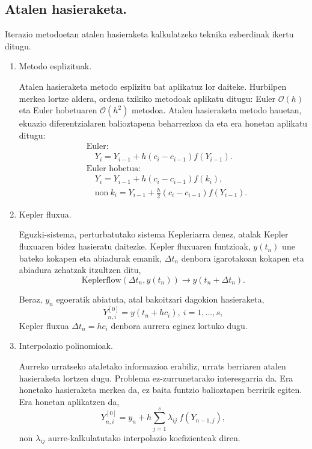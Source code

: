 \subsection*{Atalen hasieraketa.}

Iterazio metodoetan  atalen hasieraketa kalkulatzeko teknika ezberdinak ikertu ditugu. 
\begin{enumerate}
\item Metodo esplizituak.

Atalen hasieraketa metodo esplizitu bat aplikatuz lor daiteke. Hurbilpen merkea lortze aldera, ordena txikiko metodoak aplikatu ditugu: 
Euler  $\mathcal{O}(h)$ eta Euler hobetuaren $\mathcal{O}(h^2)$ metodoa. Atalen hasieraketa metodo hauetan, ekuazio diferentzialaren balioztapena beharrezkoa da eta era honetan aplikatu ditugu:
\begin{align*}
&\text{Euler}:\\
& \quad Y_i=Y_{i-1}+h (c_i-c_{i-1}) f(Y_{i-1}).\\
&\text{Euler hobetua}: \\
& \quad Y_i=Y_{i-1}+h (c_i-c_{i-1}) f(k_i),\\
& \quad \text{non} \ k_i=Y_{i-1}+\frac{h}{2} (c_i-c_{i-1}) f(Y_{i-1}).
\end{align*} 


\item Kepler fluxua.

Eguzki-sistema, perturbatutako sistema Kepleriarra denez, atalak Kepler fluxuaren bidez hasieratu daitezke. Kepler fluxuaren funtzioak, $y(t_n)$ une bateko kokapen eta abiadurak emanik, $\Delta t_n$ denbora igarotakoan kokapen eta abiadura zehatzak itzultzen ditu,
\begin{equation*}
\text{Keplerflow}(\Delta t_n, y(t_n)) \rightarrow y(t_n+\Delta t_n).
\end{equation*}

Beraz, $y_n$ egoeratik abiatuta, atal bakoitzari dagokion hasieraketa,
\begin{equation*}
Y_{n,i}^{[0]}=y(t_n+hc_i), \ i=1,\dots,s,
\end{equation*}
Kepler fluxua $\Delta t_n=hc_i$ denbora aurrera eginez lortuko dugu.  

\item Interpolazio polinomioak.

Aurreko urratseko ataletako informazioa erabiliz, urrats berriaren atalen hasieraketa lortzen dugu. Problema ez-zurrunetarako interesgarria da. Era honetako hasieraketa merkea da, ez baita funtzio balioztapen berririk egiten. Era honetan aplikatzen da,
\begin{equation*}
Y_{n,i}^{[0]}=y_n+h \sum_{j=1}^{s} \lambda_{ij} \ f(Y_{n-1,j}),
\end{equation*}
non $\lambda_{ij}$ aurre-kalkulatutako interpolazio koefizienteak diren. 



\end{enumerate}

